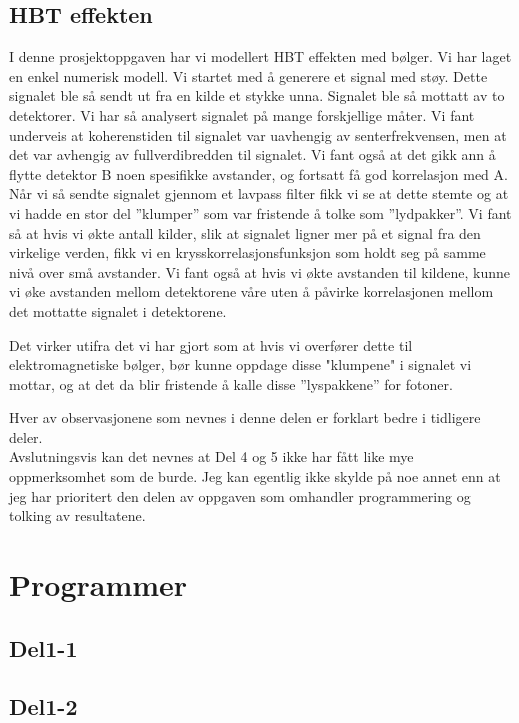 \documentclass[12pt,norsk,a4paper]{article}
\begin{document}
\subsection{HBT effekten}
I denne prosjektoppgaven har vi modellert HBT effekten med bølger. Vi har laget en enkel numerisk modell. Vi startet med å generere et signal med støy. 
Dette signalet ble så sendt ut fra en kilde et stykke unna. 
Signalet ble så mottatt av to detektorer. 
Vi har så analysert signalet på mange forskjellige måter.
Vi fant underveis at koherenstiden til signalet var uavhengig av senterfrekvensen, men at det var avhengig av fullverdibredden til signalet. 
Vi fant også at det gikk ann å flytte detektor B noen spesifikke avstander, og fortsatt få god korrelasjon med A.
Når vi så sendte signalet gjennom et lavpass filter fikk vi se at dette stemte og at vi hadde en stor del ''klumper'' som var fristende å tolke som ''lydpakker''.
Vi fant så at hvis vi økte antall kilder, slik at signalet ligner mer på et signal fra den virkelige verden, fikk vi en krysskorrelasjonsfunksjon som holdt seg på samme nivå over små avstander.
Vi fant også at hvis vi økte avstanden til kildene, kunne vi øke avstanden mellom detektorene våre uten å påvirke korrelasjonen mellom det mottatte signalet i detektorene. 

Det virker utifra det vi har gjort som at hvis vi overfører dette til elektromagnetiske bølger, bør kunne oppdage disse "klumpene" i signalet vi mottar, og at det da blir fristende å kalle disse ''lyspakkene'' for fotoner. 

Hver av observasjonene som nevnes i denne delen er forklart bedre i tidligere deler.\\

Avslutningsvis kan det nevnes at Del 4 og 5 ikke har fått like mye oppmerksomhet som de burde. Jeg kan egentlig ikke skylde på noe annet enn at jeg har prioritert den delen av oppgaven som omhandler programmering og tolking av resultatene. 

\section{Programmer}
\subsection{Del1-1}

\subsection{Del1-2}

\end{document}
